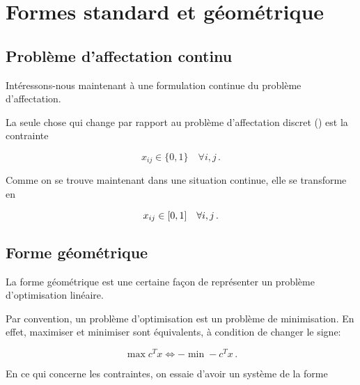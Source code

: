 \section{Formes standard et géométrique}

\subsection{Problème d'affectation continu}

	Intéressons-nous maintenant
	à une formulation continue du problème d'affectation.

	La seule chose qui change
	par rapport au problème d'affectation discret ()
	est la contrainte

	\[
	x_{ij} \in \{0, 1\} \quad \forall i,j\,.
	\]

	Comme on se trouve maintenant dans une situation continue,
	elle se transforme en

	\[
	x_{ij} \in \interval{0}{1} \quad \forall i,j\,.
	\]

\subsection{Forme géométrique}

	La forme géométrique est une certaine façon
	de représenter un problème d'optimisation linéaire.

	Par convention, un problème d'optimisation
	est un problème de minimisation.
	En effet, maximiser et minimiser sont équivalents,
	à condition de changer le signe:

	\[
	\max c^T x \iff -\min -c^T x\,.
	\]

	En ce qui concerne les contraintes,
	on essaie d'avoir un système de la forme

